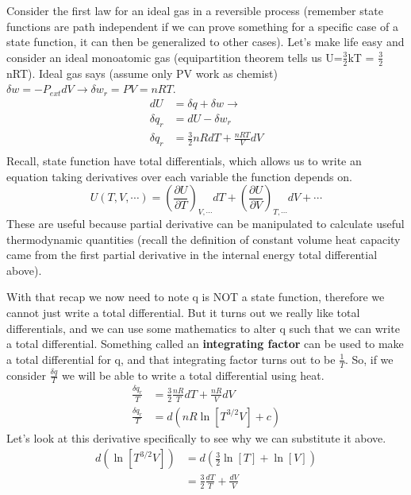 \documentclass{article}
\begin{document}
Consider the first law for an ideal gas in a reversible process (remember state functions are path independent if we can prove something for a specific case of a state function, it can then be generalized to other cases). 
Let's make life easy and consider an ideal monoatomic gas (equipartition theorem tells us U=$\frac{3}{2}$kT = $\frac{3}{2}$nRT). 
Ideal gas says (assume only PV work as chemist) $\delta w=-P_{ext}dV \rightarrow \delta w_r = PV=nRT$.
\begin{equation}
    \begin{split}
        dU &= \delta q + \delta w \rightarrow  \\
        \delta q_r &=  dU - \delta w_r  \\
         \delta q_r &=  \frac{3}{2}nRdT + \frac{nRT}{V}dV  \\
    \end{split}
\end{equation}
Recall, state function have total differentials, which allows us to write an equation taking derivatives over each variable the function depends on. 
\begin{equation}
    U(T,V,\cdots) = \left(\frac{\partial U}{\partial T}\right)_{V,\cdots}dT + \left(\frac{\partial U}{\partial V}\right)_{T,\cdots}dV + \cdots
\end{equation}
These are useful because partial derivative can be manipulated to calculate useful thermodynamic quantities (recall the definition of constant volume heat capacity came from the first partial derivative in the internal energy total differential above).

With that recap we now need to note q is NOT a state function, therefore we cannot just write a total differential. 
But it turns out we really like total differentials, and we can use some mathematics to alter q such that we can write a total differential. 
Something called an \textbf{integrating factor} can be used to make a total differential for q, and that integrating factor turns out to be $\frac{1}{T}$. 
So, if we consider $\frac{\delta q}{T}$ we will be able to write a total differential using heat. 
\begin{equation}
\begin{split}
    \frac{\delta q_r}{T} &=  \frac{3}{2}\frac{nR}{T}dT + \frac{nR}{V}dV \\
    \frac{\delta q_r}{T} &=  d \left( nR\ln[T^{3/2}V] + c \right)
    \end{split}
\end{equation}
Let's look at this derivative specifically to see why we can substitute it above.
\begin{equation}
\begin{split}
     d \left(\ln[T^{3/2}V] \right) &= d\left(\frac{3}{2}\ln[T] + \ln[V] \right) \\
    &= \frac{3}{2} \frac{dT}{T} + \frac{dV}{V}
    \end{split}
\end{equation}
\end{document}
